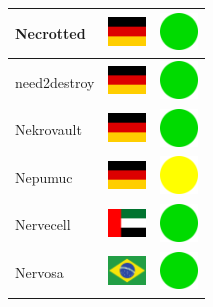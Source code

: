 \documentclass[12pt, a4paper, twoside]{report}
\begin{document}
\begin{center}
\begin{longtable}{|p{5cm}|p{2cm}|p{2cm}|}
Necrotted & \includegraphics[width=1cm]{4x3/de} & \includegraphics[width=1cm]{likes/y} \\ \hline
need2destroy & \includegraphics[width=1cm]{4x3/de} & \includegraphics[width=1cm]{likes/y} \\ \hline
Nekrovault & \includegraphics[width=1cm]{4x3/de} & \includegraphics[width=1cm]{likes/y} \\ \hline
Nepumuc & \includegraphics[width=1cm]{4x3/de} & \includegraphics[width=1cm]{likes/m} \\ \hline
Nervecell & \includegraphics[width=1cm]{4x3/ae} & \includegraphics[width=1cm]{likes/y} \\ \hline
Nervosa & \includegraphics[width=1cm]{4x3/br} & \includegraphics[width=1cm]{likes/y} \\ \hline

\end{longtable}
\end{center}
\end{document}
